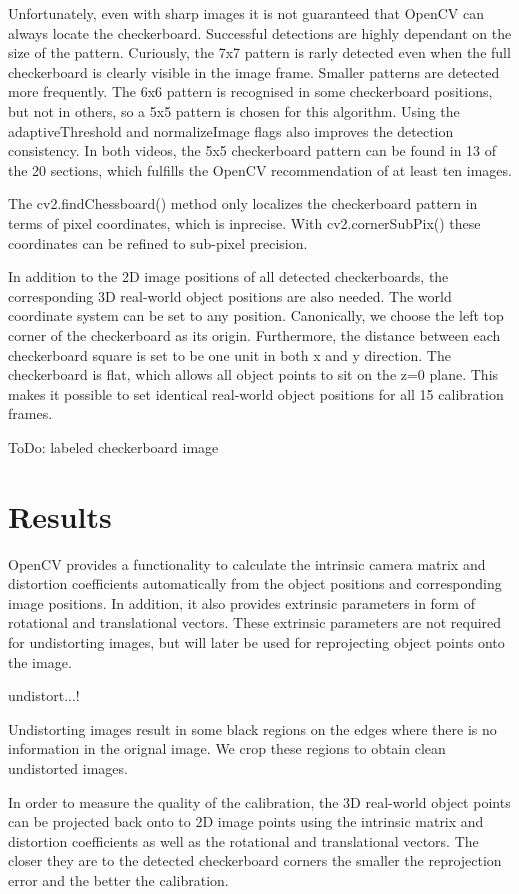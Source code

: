 \documentclass[bibliography=totoc]{scrartcl}
\begin{document}
Unfortunately, even with sharp images it is not guaranteed that OpenCV can always locate the checkerboard.
Successful detections are highly dependant on the size of the pattern. 
Curiously, the 7x7 pattern is rarly detected even when the full checkerboard is clearly visible in the image frame.
Smaller patterns are detected more frequently.
The 6x6 pattern is recognised in some checkerboard positions, but not in others, so a 5x5 pattern is chosen for this algorithm.
Using the adaptiveThreshold and normalizeImage flags also improves the detection consistency.
In both videos, the 5x5 checkerboard pattern can be found in 13 of the 20 sections, which fulfills the OpenCV recommendation of at least ten images.

The cv2.findChessboard() method only localizes the checkerboard pattern in terms of pixel coordinates, which is inprecise.
With cv2.cornerSubPix() these coordinates can be refined to sub-pixel precision.

In addition to the 2D image positions of all detected checkerboards, the corresponding 3D real-world object positions are also needed.
The world coordinate system can be set to any position. 
Canonically, we choose the left top corner of the checkerboard as its origin.
Furthermore, the distance between each checkerboard square is set to be one unit in both x and y direction. 
The checkerboard is flat, which allows all object points to sit on the z=0 plane.
This makes it possible to set identical real-world object positions for all 15 calibration frames.

ToDo: labeled checkerboard image


\section{Results}
OpenCV provides a functionality to calculate the intrinsic camera matrix and distortion coefficients automatically from the object positions and corresponding image positions.
In addition, it also provides extrinsic parameters in form of rotational and translational vectors.
These extrinsic parameters are not required for undistorting images, but will later be used for reprojecting object points onto the image.

undistort...!

Undistorting images result in some black regions on the edges where there is no information in the orignal image.
We crop these regions to obtain clean undistorted images.

In order to measure the quality of the calibration, the 3D real-world object points can be projected back onto to 2D image points using the intrinsic matrix and distortion coefficients as well as the rotational and translational vectors.
The closer they are to the detected checkerboard corners the smaller the reprojection error and the better the calibration.
\end{document}
